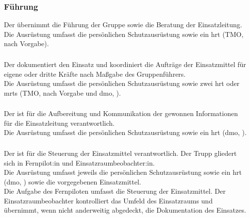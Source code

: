 \subsubsection{Führung}

Der \gruppenfuehrer{} übernimmt die Führung der Gruppe sowie die Beratung der Einsatzleitung.\\

\noindent Die Ausrüstung umfasst die persönlichen Schutzausrüstung sowie ein \ac{hrt} (TMO, nach Vorgabe).

\subsubsection{\melder}

Der \melder{} dokumentiert den Einsatz und koordiniert die Aufträge der Einsatzmittel für eigene oder dritte Kräfte nach Maßgabe des Gruppenführers.\\

\noindent Die Ausrüstung umfasst die persönlichen Schutzausrüstung sowie zwei \ac{hrt} oder \acp{mrt} (TMO, nach Vorgabe und \acs{dmo}, \dmoGroup{}).

\subsubsection{\maschinist}

Der \maschinist{} ist für die Aufbereitung und Kommunikation der gewonnen Informationen für die Einsatzleitung verantwortlich.\\

\noindent Die Ausrüstung umfasst die persönlichen Schutzausrüstung sowie ein \ac{hrt} (\acs{dmo}, \dmoGroup{}).

\subsubsection{\robotiktrupp}

Der \robotiktrupp{} ist für die Steuerung der Einsatzmittel verantwortlich. Der Trupp gliedert sich in Fernpilot:in und Einsatzraumbeobachter:in.\\

\noindent Die Ausrüstung umfasst jeweils die persönlichen Schutzausrüstung sowie ein \ac{hrt} (\acs{dmo}, \dmoGroup{}) sowie die vorgegebenen Einsatzmittel.\\

\noindent Die Aufgabe des Fernpiloten umfasst die Steuerung der Einsatzmittel. Der Einsatzraumbeobachter kontrolliert das Umfeld des Einsatzraums und übernimmt, wenn nicht anderweitig abgedeckt, die Dokumentation des Einsatzes.

